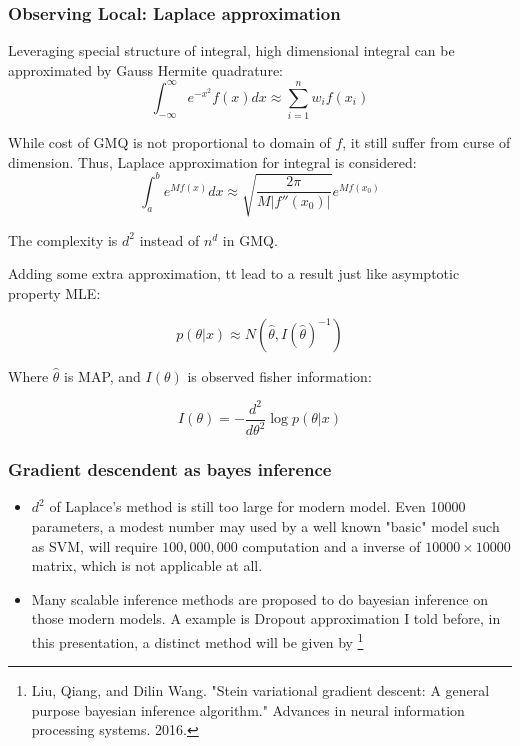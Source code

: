 \documentclass{beamer}
\begin{document}

\begin{frame}
    \frametitle{Observing Local: Laplace approximation}

    Leveraging special structure of integral, high dimensional integral can be approximated by
    Gauss Hermite quadrature:
    $$
    \int_{-\infty}^{\infty} e^{-x^2}f(x)dx \approx \sum_{i=1}^n w_i f(x_i)
    $$

    While cost of GMQ is not proportional to domain of $f$, it still suffer from curse of dimension.
    Thus, Laplace approximation for integral is considered:
    $$
    \int_a^b e^{Mf(x)}dx \approx \sqrt{\frac{2\pi}{M|f''(x_0)|}}e^{Mf(x_0)}
    $$

    The complexity is $d^2$ instead of $n^d$ in GMQ. 

\end{frame}

\begin{frame}

    Adding some extra approximation, tt lead to a result just like asymptotic property MLE:

    $$
    p(\theta|x) \approx N(\hat{\theta}, I(\hat{\theta})^{-1})
    $$

    Where $\hat{\theta}$ is MAP, and $I(\theta)$ is observed fisher information:

    $$
    I(\theta) = -\frac{d^2}{d\theta^2} \log p(\theta | x)
    $$


\end{frame}

\begin{frame}

    \frametitle{Gradient descendent as bayes inference}

    \begin{itemize}
    \item $d^2$ of Laplace's method is still too large for modern model. Even 10000 parameters,
    a modest number may used by a well known "basic" model such as SVM,
    will require $100,000,000$ computation
    and a inverse of $10000 \times 10000$ matrix, which is not applicable at all.

    \item Many scalable inference methods are proposed to do bayesian inference on those modern models.
    A example is Dropout approximation I told before, in this presentation, a distinct method will be given by
    \footnote{Liu, Qiang, and Dilin Wang. "Stein variational gradient descent: A general purpose bayesian inference algorithm." Advances in neural information processing systems. 2016.}
    \end{itemize}    

\end{frame}
\end{document}
